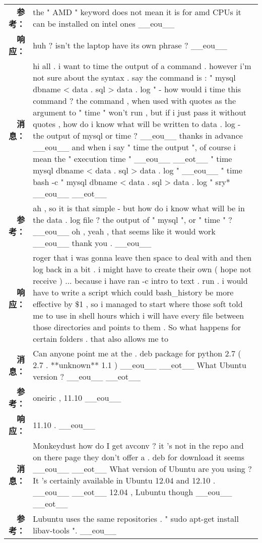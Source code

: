 \begin{tabularx}{\textwidth}{@{}rX@{}}
\textbf{参考：}&the " AMD " keyword does not mean it is for amd CPUs it can be installed on intel ones \_\_eou\_\_\\%
\textbf{响应：}&huh ? isn't the laptop have its own phrase ? \_\_eou\_\_\\%
\midrule%
\textbf{消息：}&hi all . i want to time the output of a command . however i'm not sure about the syntax . say the command is : " mysql dbname < data . sql > data . log " {-} how would i time this command ? the command , when used with quotes as the argument to " time " won't run , but if i just pass it without quotes , how do i know what will be written to data . log {-} the output of mysql or time ? \_\_eou\_\_ thanks in advance \_\_eou\_\_ and when i say " time the output ", of course i mean the " execution time " \_\_eou\_\_ \_\_eot\_\_ " time mysql dbname < data . sql > data . log " \_\_eou\_\_ " time bash {-}c " mysql dbname < data . sql > data . log " sry* \_\_eou\_\_ \_\_eot\_\_\\%
\textbf{参考：}&ah , so it is that simple {-} but how do i know what will be in the data . log file ? the output of " mysql ", or " time " ? \_\_eou\_\_ oh , yeah , that seems like it would work \_\_eou\_\_ thank you . \_\_eou\_\_\\%
\textbf{响应：}&roger that i was gonna leave then space to deal with and then log back in a bit . i might have to create their own ( hope not receive ) ... because i have ran {-}c intro to text . run . i would have to write a script which could bash\_history be more effective by \$1 , so i managed to start where those soft told me to use in shell hours which i will have every file between those directories and points to them . So what happens for certain folders . that also allows me to\\%
\midrule%
\textbf{消息：}&Can anyone point me at the . deb package for python 2.7 ( 2.7 . **unknown** 1.1 ) \_\_eou\_\_ \_\_eot\_\_ What Ubuntu version ? \_\_eou\_\_ \_\_eot\_\_\\%
\textbf{参考：}&oneiric , 11.10 \_\_eou\_\_\\%
\textbf{响应：}&11.10 . \_\_eou\_\_\\%
\midrule%
\textbf{消息：}&Monkeydust how do I get avconv ? it 's not in the repo and on there page they don't offer a . deb for download it seems \_\_eou\_\_ \_\_eot\_\_ What version of Ubuntu are you using ? It 's certainly available in Ubuntu 12.04 and 12.10 . \_\_eou\_\_ \_\_eot\_\_ 12.04 , Lubuntu though \_\_eou\_\_ \_\_eot\_\_\\%
\textbf{参考：}&Lubuntu uses the same repositories . " sudo apt{-}get install libav{-}tools ". \_\_eou\_\_\\%

\end{tabularx}
